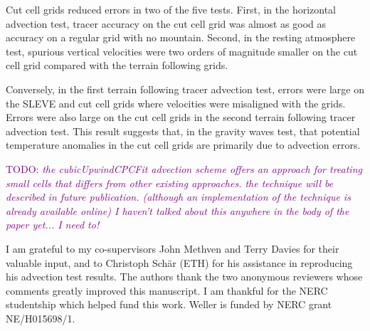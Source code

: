 \documentclass{ametsoc}
\newcommand{\TODO}[1]{\textcolor{purple}{TODO: \emph{#1}}}
\begin{document}
Cut cell grids reduced errors in two of the five tests.  First, in the horizontal advection test, tracer accuracy on the cut cell grid was almost as good as accuracy on a regular grid with no mountain.  Second, in the resting atmosphere test, spurious vertical velocities were two orders of magnitude smaller on the cut cell grid compared with the terrain following grids.

Conversely, in the first terrain following tracer advection test, errors were large on the SLEVE and cut cell grids where velocities were misaligned with the grids.  Errors were also large on the cut cell grids in the second terrain following tracer advection test.  This result suggests that, in the gravity waves test, that potential temperature anomalies in the cut cell grids are primarily due to advection errors.

\TODO{the cubicUpwindCPCFit advection scheme offers an approach for treating small cells that differs from other existing approaches.  the technique will be described in future publication.  (although an implementation of the technique is already available online)  I haven't talked about this anywhere in the body of the paper yet... I need to!}

\acknowledgments
I am grateful to my co-supervisors John Methven and Terry Davies for their valuable input, and to Christoph Sch\"{a}r (ETH) for his assistance in reproducing his advection test results.  The authors thank the two anonymous reviewers whose comments greatly improved this manuscript.  I am thankful for the NERC studentship which helped fund this work.  Weller is funded by NERC grant NE/H015698/1.

\begin{appendices}

\end{appendices}






\end{document}
